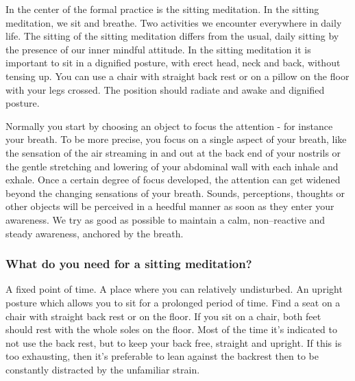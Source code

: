 \documentclass[../main.tex]{subfiles}
\begin{document}
\label{Ex:SittingMed}
In the center of the formal practice is the sitting meditation.
In the {sitting meditation}, we {sit and breathe}.
Two activities we encounter everywhere in daily life. 
The sitting of the sitting meditation differs from the usual, daily sitting by the presence of our {inner mindful attitude}. 
In the sitting meditation it is important to sit in a {dignified posture},
with erect head, neck and back, without tensing up. 
You can use a chair with {straight back rest} or on a pillow on the {floor with your legs crossed}.
The position should radiate and {awake and dignified posture}.

Normally you start by choosing an {object to focus the attention} - for instance your {breath}. 
To be more precise, you focus on a single aspect of your breath,
like the sensation of the {air streaming in and out} at the back end of your nostrils
or the gentle {stretching and lowering of your abdominal wall} with each inhale and exhale.
Once a certain degree of focus developed, the {attention can get widened} beyond the changing sensations of your breath. 
Sounds, perceptions, thoughts or other objects will be perceived in a heedful manner as soon as they enter your awareness. We try as good as possible to maintain a {calm, non--reactive and steady awareness}, anchored by the breath.

\subsubsection{What do you need for a sitting meditation?}

 A {fixed point of time}. 
 A place where you can relatively {undisturbed}. 
 An {upright posture} which allows you to sit for a prolonged period of time. 
 Find a seat on a chair with straight back rest or on the floor.
 If you sit on a chair, both {feet} should rest with the whole {soles on the floor}.
 Most of the time it’s indicated to not use the back rest, but to keep your {back free, straight and upright}.
 If this is too exhausting, then it’s preferable to lean against the backrest then to be constantly distracted by the unfamiliar strain.
\end{document}
